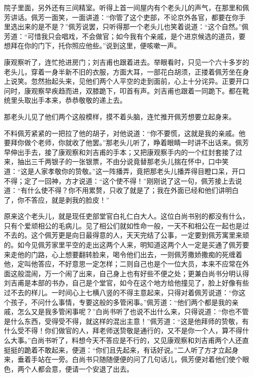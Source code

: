 \documentclass[12pt,UTF8]{ctexbook}
\begin{document}
{{{院子里面，另外还有三间精室。听得上首一间屋内有个老头儿的声气，在那里和佩芳讲话。佩芳一面笑，一面讲道：“你管了这个吏部，不论京外各官，都要在你手里选出来的是不是？”佩芳说罢，只听得那一个老头儿也笑着说道：“这个自然。”佩芳道：“可惜我只会唱戏，不会做官；如今我有个亲戚，是个进京候选的道员，要想拜在你的门下，托你照应他些。”说到这里，便咳嗽一声。

康观察听了，连忙抢进房门；刘吉甫也跟着进去。举眼看时，只见一个六十多岁的老头儿，穿着一身半新不旧的衣服，方面大耳，一部花白胡须，正搂着佩芳坐在身上说笑。忽然抬起头来，见他们两个人平空的走到面前，心上十分诧异。正要开口问时，康观察早疾趋而进，双膝跪下，叩首有声。刘吉甫也跟着一同跪下。都在靴统里头取出手本来，恭恭敬敬的递上去。

那老头儿见了他们两个这般模样，摸不着头脑，连忙推开佩芳想要立起身来。

不料佩芳紧紧的一把拉了他的胡子，对他说道：“你不要慌，这就是我的亲戚。他要拜你做个老师，你就收了他罢。”那老头儿听了，睁着眼睛一时讲不出话来。佩芳早伸出手去，接了康观察和刘吉甫的手本；又把康观察手内的一个红封套接了过来，抽出三千两银子的一张银票，不由分说竟替那老头儿揣在怀中，口中笑道：“这是人家孝敬你的贽敬。”这一阵播弄，竟把那老头儿播弄得目瞪口呆，开口不得；定了一回神，方才说道：“这个使不得！”刚刚说了这一句，佩芳接上去说道：“有什么使不得？你不用累赘，只收了就是了；我在外面已经和他们讲明白了，你不答应，就是剥我的脸皮！”

原来这个老头儿，就是现任吏部堂官白礼仁白大人。这位白尚书别的都没有什么，只有个爱顽相公的毛病儿。见了相公们就如性命一般，一天不和相公在一起也是过不去的。这个佩芳更是向日最得意的人，天天完结了公事，一定要到佩芳寓里来顽的。如今见佩芳家里平空的走出这两个人来，明知道这两个人一定是买通了佩芳要来走他的门路，心上想要翻转脸来，喝令他们出去，一则佩芳撒娇撒痴的死缠着他，定叫他答应，不好意思一定怎样；二则自己也是个一位大员，本来不应常在外面这般混闹，万一个闹了出来，自己身上也有好些不便之处；更兼白尚书分明认得刘吉甫是本部的书办，自己是个堂官，如今在这个地方给他撞见了，脸上好像有些过不去的样儿。一时间心上七横八竖的不得主意起来，只得对着佩芳说道：“你这个孩子，不问什么事情，专要这般的多管闲事。”佩芳道：“他们两个都是我的亲戚，怎么又是我多管闲事呢？”白尚书听了也说不出什么来，只得说道：“你也不管是什么东西，受得受不得，就这样的混出主意！”佩芳道：“这是他拜师的贽敬，有什么受不得！你们做官的人，拜老师送贽敬是通行的，又不是你一个人，算不得什么大事。”白尚书听了，料想今天不答应是不行的，又见康观察和刘吉甫两个人还直挺挺的跪着不敢起来，便道：“你们且先起来，有话好说。”二人听了方才立起身来，垂着手站在一旁。白尚书只随随便便的问了几句话儿，佩芳便对着他们使个眼色，两个人都会意，便请一个安退了出去。

}}}
\end{document}
